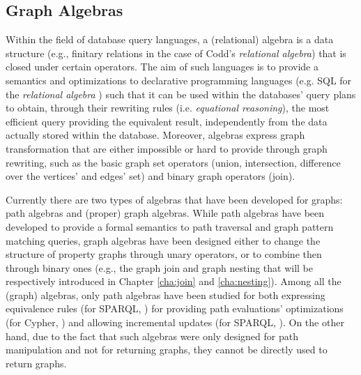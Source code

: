 \subsection{Graph Algebras}\label{cite:galg}
Within the field of database query languages, a (relational) algebra is a data structure (e.g., finitary relations in the case of Codd's \textit{relational algebra}) that is closed under certain operators. The aim of such languages is to provide a semantics and optimizations to declarative programming languages (e.g. SQL for the \textit{relational algebra} \cite{ceri1985}) such that it can be used within the databases' query plans to obtain, through their rewriting rules (i.e. \textit{equational reasoning}), the most efficient query providing the equivalent result, independently from the data actually stored within the database. Moreover, algebras express graph transformation that are either impossible or hard to provide through graph rewriting, such as the basic graph set operators (union, intersection, difference over the vertices' and edges' set) and binary graph operators (join).

Currently there are two types of algebras that have been developed for graphs: path algebras and (proper) graph algebras. While path algebras have been developed to provide a formal semantics to path traversal and graph pattern matching queries, graph algebras have been designed either to change the structure of property graphs through unary operators, or to combine then through binary ones (e.g., the graph join and graph nesting that will be respectively introduced in Chapter \vref{cha:join} and \vref{cha:nesting}). Among all the (graph) algebras, only path algebras have been studied for both expressing equivalence rules (for SPARQL, \cite{Perez2009}) for providing path evaluations' optimizations (for Cypher, \cite{Neo4jAlg}) and allowing incremental updates (for SPARQL, \cite{SparqlIncr}). On the other hand, due to the fact that such algebras were only designed for path manipulation and not for returning graphs, they cannot be directly used to return graphs.

